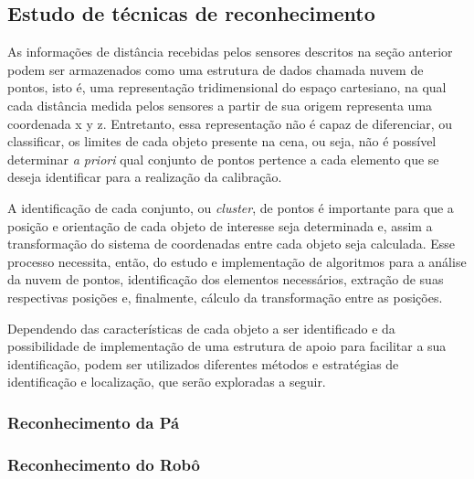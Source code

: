 \subsection{Estudo de técnicas de reconhecimento} 

As informações de distância recebidas pelos sensores descritos na seção
anterior podem ser armazenados como uma estrutura de dados chamada nuvem de
pontos, isto é, uma representação tridimensional do espaço cartesiano, na qual cada distância medida pelos
sensores a partir de sua origem representa uma coordenada x y z.
Entretanto, essa representação não é capaz de diferenciar, ou classificar, os
limites de cada objeto presente na cena, ou seja, não é possível determinar
\textit{a priori} qual conjunto de pontos pertence a cada elemento que se deseja
identificar para a realização da calibração.

A identificação de cada conjunto, ou \textit{cluster}, de pontos é importante
para que a posição e orientação de cada objeto de interesse seja determinada e,
assim a transformação do sistema de coordenadas entre cada objeto seja
calculada. Esse processo necessita, então, do estudo e implementação de
algoritmos para a análise da nuvem de pontos, identificação dos elementos
necessários, extração de suas respectivas posições e, finalmente, cálculo da
transformação entre as posições. 

Dependendo das características de cada objeto a ser identificado e da
possibilidade de implementação de uma estrutura de apoio para facilitar a sua
identificação, podem ser utilizados diferentes métodos e estratégias de
identificação e localização, que serão exploradas a seguir.

\subsubsection{Reconhecimento da Pá} 


\subsubsection{Reconhecimento do Robô}